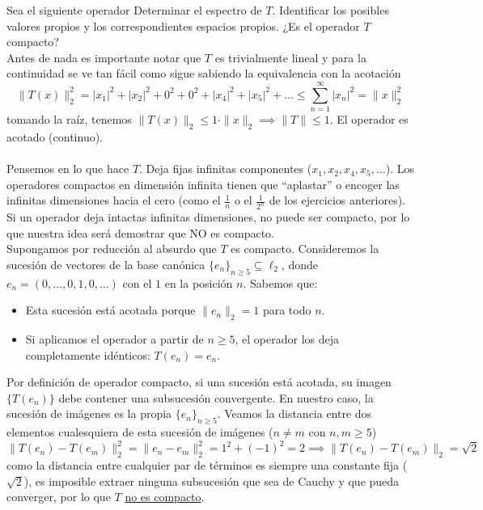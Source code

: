 \begin{ejercicio}
    Sea el siguiente operador
    Determinar el espectro de $T$. Identificar los posibles valores propios y los correspondientes espacios propios. ¿Es el operador $T$ compacto? \\
    \noindent
    Antes de nada es importante notar que $T$ es trivialmente lineal y para la continuidad se ve tan fácil como sigue sabiendo la equivalencia con la acotación
    $$\|T(x)\|_2^2 = |x_1|^2 + |x_2|^2 + 0^2 + 0^2 + |x_4|^2 + |x_5|^2 + \dots \leq \sum_{n=1}^{\infty} |x_n|^2 = \|x\|_2^2$$
    tomando la raíz, tenemos $\|T(x)\|_2 \leq 1 \cdot \|x\|_2 \implies \|T\| \leq 1$. El operador es acotado (continuo). \\ \\
    \noindent
    Pensemos en lo que hace $T$. Deja fijas infinitas componentes ($x_1, x_2, x_4, x_5, \dots$). Los operadores compactos en dimensión infinita tienen que ``aplastar'' o encoger las infinitas dimensiones hacia el cero (como el $\frac{1}{n}$ o el $\frac{1}{2^n}$ de los ejercicios anteriores). Si un operador deja intactas infinitas dimensiones, no puede ser compacto, por lo que nuestra idea será demostrar que NO es compacto. \\

    \noindent
    Supongamos por reducción al absurdo que $T$ es compacto. Consideremos la sucesión de vectores de la base canónica $\{e_n\}_{n \geq 5} \subseteq \ell_2$, donde $e_n = (0, \dots, 0, 1, 0, \dots)$ con el $1$ en la posición $n$. Sabemos que:
    \begin{itemize}
        \item Esta sucesión está acotada porque $\|e_n\|_2 = 1$ para todo $n$.
        \item Si aplicamos el operador a partir de $n \geq 5$, el operador los deja completamente idénticos: $T(e_n) = e_n$.
    \end{itemize}
    Por definición de operador compacto, si una sucesión está acotada, su imagen $\{T(e_n)\}$ debe contener una subsucesión convergente. En nuestro caso, la sucesión de imágenes es la propia $\{e_n\}_{n \geq 5}$. Veamos la distancia entre dos elementos cualesquiera de esta sucesión de imágenes ($n \neq m$ con $n, m \geq 5$)
    $$\|T(e_n) - T(e_m)\|_2^2 = \|e_n - e_m\|_2^2 = 1^2 + (-1)^2 = 2 \implies \|T(e_n) - T(e_m)\|_2 = \sqrt{2}$$
    como la distancia entre cualquier par de términos es siempre una constante fija ($\sqrt{2}$), es imposible extraer ninguna subsucesión que sea de Cauchy y que pueda converger, por lo que $T$ \underline{no es compacto}. \\


\end{ejercicio}
